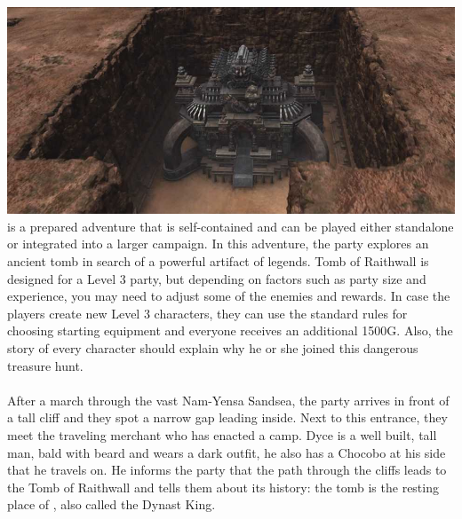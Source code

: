 %
\\\\
%
\includegraphics[width=\columnwidth]{./art/tombofraithwall/tomb1.jpg}
%
\ofpar
%
 is a prepared adventure that is self-contained and can be played either standalone or integrated into a larger campaign.
In this adventure, the party explores an ancient tomb in search of a powerful artifact of legends.
Tomb of Raithwall is designed for a Level 3 party, but depending on factors such as party size and experience, you may need to adjust some of the enemies and rewards.
In case the players create new Level 3 characters, they can use the standard rules for choosing starting equipment and everyone receives an additional 1500G.
Also, the story of every character should explain why he or she joined this dangerous treasure hunt.
%
\ofpar
%
\\\\
%
After a march through the vast Nam-Yensa Sandsea, the party arrives in front of a tall cliff and they spot a narrow gap leading inside.
Next to this entrance, they meet the traveling merchant  who has enacted a camp.
Dyce is a well built, tall man, bald with beard and wears a dark outfit, he also has a Chocobo at his side that he travels on.
He informs the party that the path through the cliffs leads to the Tomb of Raithwall and tells them about its history:
the tomb is the resting place of , also called the Dynast King.
